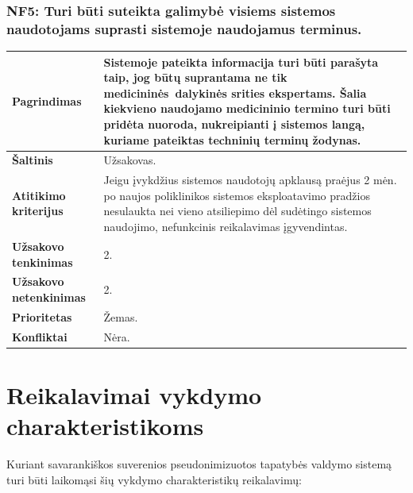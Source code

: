 \documentclass[12pt]{article}
\begin{document}
\subsubsection*{NF5: Turi būti suteikta galimybė visiems sistemos naudotojams
suprasti sistemoje naudojamus terminus.}
\label{sec:NF5}
\begin{table}[htb!]
    \captionsetup{justification=centering}
    \begin{tabular}{|m{4.9cm}|m{11cm}|}
        \hline
        \raggedleft \textbf{\cellcolor{deepchampagne}Pagrindimas} &
        Sistemoje pateikta informacija turi būti parašyta taip, jog būtų
        suprantama ne tik medicininės dalykinės srities ekspertams. Šalia
        kiekvieno naudojamo medicininio termino turi būti pridėta nuoroda,
        nukreipianti į sistemos langą, kuriame pateiktas techninių terminų
        žodynas. \\
        \hline
        \raggedleft \textbf{\cellcolor{deepchampagne}Šaltinis} & Užsakovas. \\
        \hline
        \raggedleft \textbf{\cellcolor{deepchampagne}Atitikimo kriterijus} & 
        Jeigu įvykdžius sistemos naudotojų apklausą praėjus 2 mėn. po naujos
        poliklinikos sistemos eksploatavimo pradžios nesulaukta nei vieno
        atsiliepimo dėl sudėtingo sistemos naudojimo, nefunkcinis reikalavimas
        įgyvendintas. \\
        \hline
        \raggedleft \textbf{\cellcolor{deepchampagne}Užsakovo tenkinimas} & 2. \\
        \hline
        \raggedleft \textbf{\cellcolor{deepchampagne}Užsakovo netenkinimas} & 2. \\
        \hline
        \raggedleft \textbf{\cellcolor{deepchampagne}Prioritetas} & Žemas. \\
        \hline
        \raggedleft \textbf{\cellcolor{deepchampagne}Konfliktai} & Nėra. \\
        \hline
    \end{tabular}
\end{table}

\section{Reikalavimai vykdymo charakteristikoms}
Kuriant savarankiškos suverenios pseudonimizuotos tapatybės valdymo sistemą
turi būti laikomąsi šių vykdymo charakteristikų reikalavimų:
\end{document}
